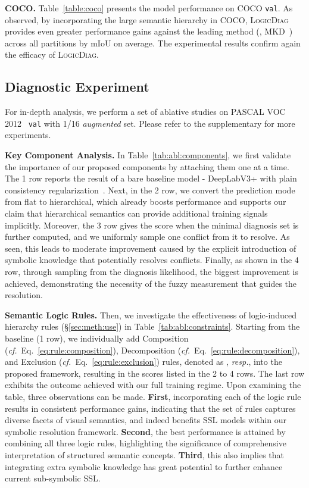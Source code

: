 \documentclass[10pt,twocolumn,letterpaper]{article}
\def\Ours{{\textsc{LogicDiag}}}
\begin{document}
\noindent\textbf{COCO.} Table~\ref{table:coco} presents the model performance on COCO \texttt{val}. As observed, by incorporating the large semantic hierarchy in COCO, {\Ours} provides even greater performance gains against the leading method (\ie, MKD~\cite{yuan2022semi}) across all partitions by  mIoU on average. The experimental results confirm again the efficacy of {\Ours}.

\vspace{3pt}
\subsection{Diagnostic Experiment}\label{sec:exp:dig}

For in-depth analysis, we perform a set of ablative studies on PASCAL VOC 2012~\cite{everingham2015pascal} \texttt{val} with 1/16 \textit{augmented} set.
Please refer to the supplementary for more experiments.


\noindent\textbf{Key Component Analysis.}
In Table~\ref{tab:abl:components}, we first validate the importance of our proposed components by attaching them one at a time.
The 1 row reports the result of a bare baseline model - DeepLabV3+ with plain consistency regularization~\cite{sohn2020fixmatch}.
Next, in the 2 row, we convert the prediction mode from flat to hierarchical, which already boosts performance and supports our claim that hierarchical semantics can provide additional training signals implicitly. 
Moreover, the 3 row gives the score when the minimal diagnosis set is further computed, and we uniformly sample one conflict from it to resolve. As seen, this leads to moderate improvement caused by the explicit introduction of symbolic knowledge that potentially resolves conflicts.
Finally, as shown in the 4 row, through sampling from the diagnosis likelihood, the biggest improvement is achieved, demonstrating the necessity of the fuzzy measurement that guides the resolution.


\noindent\textbf{Semantic Logic Rules.}
Then, we investigate the effectiveness of logic-induced hierarchy rules (\S\ref{sec:meth:use}) in Table~\ref{tab:abl:constraints}. Starting from the baseline (1 row), we individually add Composition (\textit{cf.\!}~Eq.~\ref{eq:rule:composition}), Decomposition (\textit{cf.\!}~Eq.~\ref{eq:rule:decomposition}), and Exclusion (\textit{cf.\!}~Eq.~\ref{eq:rule:exclusion}) rules, denoted as , \textit{resp.}, into the proposed framework, resulting in the scores listed in the 2 to 4 rows. The last row exhibits the outcome achieved with our full training regime.
Upon examining the table, three observations can be made.
\textbf{First}, incorporating each of the logic rule results in consistent performance gains, indicating that the set of rules captures diverse facets of visual semantics, and indeed benefits SSL models within our symbolic resolution framework.
\textbf{Second}, the best performance is attained by combining all three logic rules, highlighting the significance of comprehensive interpretation of structured semantic concepts.
\textbf{Third}, this also implies that integrating extra symbolic knowledge has great potential to further enhance current sub-symbolic SSL.
\end{document}
